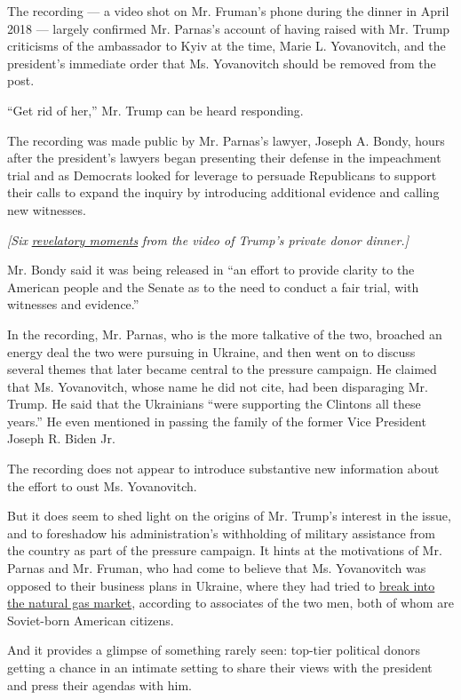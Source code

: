 The recording --- a video shot on Mr. Fruman's phone during the dinner
in April 2018 --- largely confirmed Mr. Parnas's account of having
raised with Mr. Trump criticisms of the ambassador to Kyiv at the time,
Marie L. Yovanovitch, and the president's immediate order that Ms.
Yovanovitch should be removed from the post.

``Get rid of her,'' Mr. Trump can be heard responding.

The recording was made public by Mr. Parnas's lawyer, Joseph A. Bondy,
hours after the president's lawyers began presenting their defense in
the impeachment trial and as Democrats looked for leverage to persuade
Republicans to support their calls to expand the inquiry by introducing
additional evidence and calling new witnesses.

\emph{{[}Six}
\href{https://www.nytimes.com/2020/01/26/us/politics/trump-recording-parnas-ukraine.html}{\emph{revelatory
moments}} \emph{from the video of Trump's private donor dinner.{]}}

Mr. Bondy said it was being released in ``an effort to provide clarity
to the American people and the Senate as to the need to conduct a fair
trial, with witnesses and evidence.''

In the recording, Mr. Parnas, who is the more talkative of the two,
broached an energy deal the two were pursuing in Ukraine, and then went
on to discuss several themes that later became central to the pressure
campaign. He claimed that Ms. Yovanovitch, whose name he did not cite,
had been disparaging Mr. Trump. He said that the Ukrainians ``were
supporting the Clintons all these years.'' He even mentioned in passing
the family of the former Vice President Joseph R. Biden Jr.

The recording does not appear to introduce substantive new information
about the effort to oust Ms. Yovanovitch.

But it does seem to shed light on the origins of Mr. Trump's interest in
the issue, and to foreshadow his administration's withholding of
military assistance from the country as part of the pressure campaign.
It hints at the motivations of Mr. Parnas and Mr. Fruman, who had come
to believe that Ms. Yovanovitch was opposed to their business plans in
Ukraine, where they had tried to
\href{https://www.nytimes.com/2019/10/07/us/politics/rick-perry-ukraine.html}{break
into the natural gas market}, according to associates of the two men,
both of whom are Soviet-born American citizens.

And it provides a glimpse of something rarely seen: top-tier political
donors getting a chance in an intimate setting to share their views with
the president and press their agendas with him.

